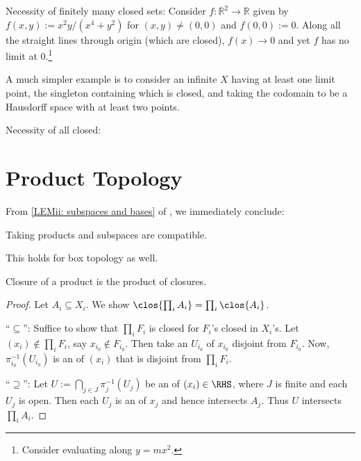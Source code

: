 	\begin{rmk}
		\begin{mylist}
			\item Necessity of finitely many closed sets: Consider $f\colon \mathbb R^2\to\mathbb R$ given by $f(x, y) := x^2y/(x^4 + y^2)$ for $(x, y)\ne (0, 0)$ and $f(0, 0) := 0$. Along all the straight lines through origin (which are closed), $f(x)\to 0$ and yet $f$ has no limit at $0$.\footnote{
				Consider evaluating along $y = mx^2$.
			}
			
			A much simpler example is to consider an infinite $X$ having at least one limit point, the singleton containing which is closed, and taking the codomain to be a Hausdorff space with at least two points.
			
			\item Necessity of all closed:
		\end{mylist}
	\end{rmk}





\section{Product Topology}

	From \ref{LEMii: subspaces and bases} of , we immediately conclude:

	\begin{lem}
		Taking products and subspaces are compatible.
	\end{lem}
	
	\begin{rmk}
		This holds for box topology as well.
	\end{rmk}
	
	\begin{lem}
		Closure of a product is the product of closures.
	\end{lem}
	
	\begin{proof}
		Let $A_i\subseteq X_i$. We show $\clos{\prod_i A_i} = \prod_i\clos{A_i}$.
		
		``$\subseteq$'': Suffice to show that $\prod_i F_i$ is closed for $F_i$'s closed in $X_i$'s. Let $(x_i)\notin\prod_i F_i$, say $x_{i_0}\notin F_{i_0}$. Then take an \onbd $U_{i_0}$ of $x_{i_0}$ disjoint from $F_{i_0}$. Now, $\pi_{i_0}^{-1}(U_{i_0})$ is an \onbd of $(x_i)$ that is disjoint from $\prod_i F_i$.
		
		``$\supseteq$'': Let $U := \bigcap_{j\in J}\pi_j^{-1}(U_j)$ be an \onbd of $(x_i)\in\RHS$, where $J$ is finite and each $U_j$ is open. Then each $U_j$ is an \onbd of $x_j$ and hence intersects $A_j$. Thus $U$ intersects $\prod_i A_i$.
	\end{proof}
	
